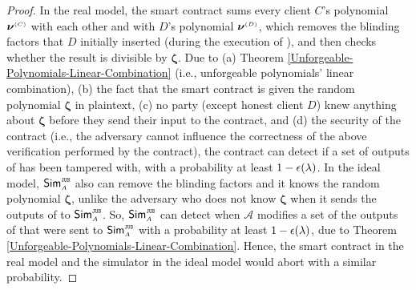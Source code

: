 \begin{proof}
In the real model, the smart contract sums every client $C$'s polynomial $\bm\nu^{ \scriptscriptstyle {  {(C)}} }$ with each other and with $D$'s polynomial $\bm\nu^{ \scriptscriptstyle {  {(D)}} }$, which removes the blinding factors that $D$ initially inserted (during the execution of \vopr), and then checks whether the result is divisible by  $\bm \zeta$. Due to (a) Theorem \ref{Unforgeable-Polynomials-Linear-Combination} (i.e., unforgeable polynomials’ linear combination), (b) the fact that the smart contract is given the random polynomial $\bm \zeta$ in plaintext, (c) no party (except honest client $D$) knew anything about $\bm \zeta$ before they send their input to the contract, and (d) the security of the contract (i.e., the adversary cannot influence the correctness of the above verification performed by the contract), the contract can detect if a set of outputs of \vopr has been tampered with, with a probability at least $1-\epsilon(\lambda)$. In the ideal model, $\mathsf{Sim}^{\scriptscriptstyle \mathtt{JUS}}_{\scriptscriptstyle A}$ also can remove the blinding factors and it knows the random polynomial $ {\bm \zeta}$, unlike the adversary who does not know $ {\bm \zeta}$ when it sends the outputs of \vopr to $\mathsf{Sim}^{\scriptscriptstyle \mathtt{JUS}}_{\scriptscriptstyle A}$. So, $\mathsf{Sim}^{\scriptscriptstyle \mathtt{JUS}}_{\scriptscriptstyle A}$ can detect when $\mathcal{A}$ modifies a set of the outputs of \vopr that were sent to  $\mathsf{Sim}^{\scriptscriptstyle \mathtt{JUS}}_{\scriptscriptstyle A}$ with a probability at least $1-\epsilon(\lambda)$,  due to Theorem \ref{Unforgeable-Polynomials-Linear-Combination}. Hence, the smart contract in the real model and the simulator in the ideal model would abort with a similar probability. 


\end{proof}
